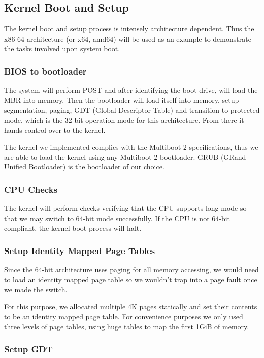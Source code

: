 \documentclass[conference]{IEEEtran}
\begin{document}
\subsection{Kernel Boot and Setup}

The kernel boot and setup process is intensely architecture dependent. Thus the x86-64 architecture (or x64, amd64) will be used as an example to demonstrate the tasks involved upon system boot.

\subsubsection{BIOS to bootloader}

The system will perform POST and after identifying the boot drive, will load the MBR into memory. Then the bootloader will load itself into memory, setup segmentation, paging, GDT (Global Descriptor Table) and transition to protected mode, which is the 32-bit operation mode for this architecture. From there it hands control over to the kernel.

The kernel we implemented complies with the Multiboot 2 specifications, thus we are able to load the kernel using any Multiboot 2 bootloader. GRUB (GRand Unified Bootloader) is the bootloader of our choice.

\subsubsection{CPU Checks}

The kernel will perform checks verifying that the CPU supports long mode so that we may switch to 64-bit mode successfully. If the CPU is not 64-bit compliant, the kernel boot process will halt.

\subsubsection{Setup Identity Mapped Page Tables}

Since the 64-bit architecture uses paging for all memory accessing, we would need to load an identity mapped page table so we wouldn't trap into a page fault once we made the switch.

For this purpose, we allocated multiple 4K pages statically and set their contents to be an identity mapped page table. For convenience purposes we only used three levels of page tables, using huge tables to map the first 1GiB of memory.

\subsubsection{Setup GDT}
\end{document}

